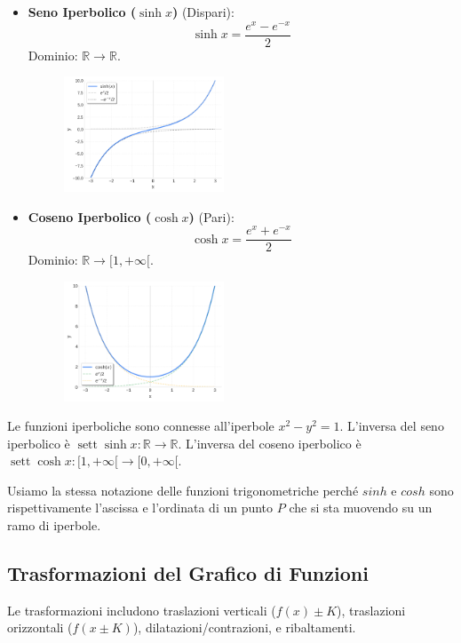 \begin{itemize}
    \item \textbf{Seno Iperbolico ($\sinh x$)} (Dispari):
    \[ \sinh x = \frac{e^x - e^{-x}}{2} \]
    Dominio: $\mathbb{R} \to \mathbb{R}$.

    \begin{figure}[h]
        \centering
        \includegraphics[width=0.45\textwidth]{img/grafico_senh.png} %
    \end{figure}

    \item \textbf{Coseno Iperbolico ($\cosh x$)} (Pari):
    \[ \cosh x = \frac{e^x + e^{-x}}{2} \]
    Dominio: $\mathbb{R} \to [1, +\infty[$.

    \begin{figure}[h]
        \centering
        \includegraphics[width=0.45\textwidth]{img/grafico_cosh.png} %
    \end{figure}
\end{itemize}
Le funzioni iperboliche sono connesse all'iperbole $x^2 - y^2 = 1$. L'inversa del seno iperbolico è $\operatorname{sett}\sinh x: \mathbb{R} \to \mathbb{R}$. L'inversa del coseno iperbolico è $\operatorname{sett}\cosh x: [1, +\infty[ \to [0, +\infty[$.


  Usiamo la stessa notazione delle funzioni trigonometriche perché $sinh$ e $cosh$ sono rispettivamente l'ascissa e l'ordinata di un punto $P$ che si sta muovendo su un ramo di iperbole.

  \subsection{Trasformazioni del Grafico di Funzioni}
Le trasformazioni includono traslazioni verticali ($f(x) \pm K$), traslazioni orizzontali ($f(x \pm K)$), dilatazioni/contrazioni, e ribaltamenti.

